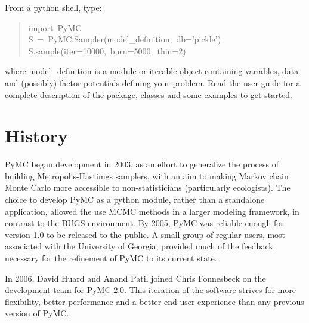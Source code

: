 From a python shell, type:
\begin{quote}{\ttfamily \raggedright \noindent
import~PyMC~\\
S~=~PyMC.Sampler(model{\_}definition,~db='pickle')~\\
S.sample(iter=10000,~burn=5000,~thin=2)
}\end{quote}

where model{\_}definition is a module or iterable object containing variables, data and (possibly) factor potentials defining your problem. Read the \href{docs/pdf/new_interface.pdf}{user guide} for a
complete description of the package, classes and some examples to get started.



\hypertarget{history}{}
\section*{History}
\label{history}

PyMC began development in 2003, as an effort to generalize the process of building Metropolis-Hastimgs samplers, with an aim to making Markov chain Monte Carlo more accessible to non-statisticians (particularly ecologists). The choice to develop PyMC as a python module, rather than a standalone application, allowed the use MCMC methods in a larger modeling framework, in contrast to the BUGS environment. By 2005, PyMC was reliable enough for version 1.0 to be released to the public. A small group of regular users, most associated with the University of Georgia, provided much of the feedback necessary for the refinement of PyMC to its current state.

In 2006, David Huard and Anand Patil joined Chris Fonnesbeck on the development team for PyMC 2.0. This iteration of the software strives for more flexibility, better performance and a better end-user experience than any previous version of PyMC.



\